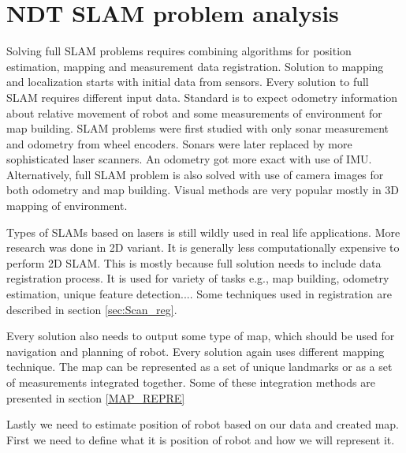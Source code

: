 \chapter{NDT SLAM problem analysis}

Solving full \gls{SLAM} problems requires combining algorithms for position estimation, mapping and measurement data registration. 
Solution to mapping and localization starts with initial data from sensors. Every solution to full SLAM requires different input data. Standard is to expect odometry information about relative movement of robot and some measurements of environment for map building. \gls{SLAM} problems were first studied with only sonar measurement and odometry from wheel encoders. Sonars were later replaced by more sophisticated laser scanners. An odometry got more exact with use of \gls{IMU}. Alternatively, full \gls{SLAM} problem is also solved with use of camera images for both odometry and map building. Visual methods are very popular mostly in 3D mapping of environment. 

Types of \gls{SLAM}s based on lasers is still wildly used in real life applications. More research was done in 2D variant. It is generally less computationally expensive to perform 2D \gls{SLAM}. This is mostly because full solution needs to include data registration process. It is used for variety of tasks e.g., map building, odometry estimation, unique feature detection.... Some techniques used in registration are described in section \ref{sec:Scan_reg}.

Every solution also needs to output some type of map, which should be used for navigation and planning of robot. Every solution again uses different mapping technique. The map can be represented as a set of unique landmarks or as a set of measurements integrated together. Some of these integration methods are presented in section \ref{MAP_REPRE}

Lastly we need to estimate position of robot based on our data and created map. First we need to define what it is position of robot and how we will represent it.   
